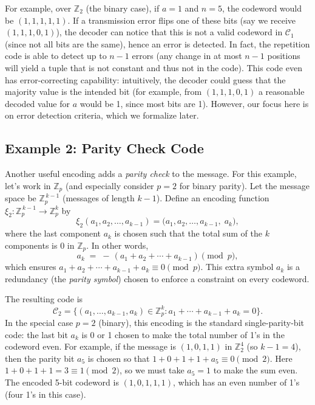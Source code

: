 \documentclass[docmute]{article}
\begin{document}
\medskip

For example, over $\mathbb{Z}_2$ (the binary case), if $a=1$ and $n=5$, the codeword would be $(1,1,1,1,1)$. If a transmission error flips one of these bits (say we receive $(1,1,1,0,1)$), the decoder can notice that this is not a valid codeword in $\mathcal{C}_1$ (since not all bits are the same), hence an error is detected. In fact, the repetition code is able to detect up to $n-1$ errors (any change in at most $n-1$ positions will yield a tuple that is not constant and thus not in the code). This code even has error-correcting capability: intuitively, the decoder could guess that the majority value is the intended bit (for example, from $(1,1,1,0,1)$ a reasonable decoded value for $a$ would be 1, since most bits are 1). However, our focus here is on error detection criteria, which we formalize later.

\subsection*{Example 2: Parity Check Code}
Another useful encoding adds a \emph{parity check} to the message. For this example, let's work in $\mathbb{Z}_p$ (and especially consider $p=2$ for binary parity). Let the message space be $\mathbb{Z}_p^{\,k-1}$ (messages of length $k-1$). Define an encoding function $\xi_2: \mathbb{Z}_p^{\,k-1} \to \mathbb{Z}_p^k$ by 
\[ \xi_2(a_1, a_2, \ldots, a_{k-1}) = \big(a_1, a_2, \ldots, a_{k-1}, \; a_k\big), \] 
where the last component $a_k$ is chosen such that the total sum of the $k$ components is 0 in $\mathbb{Z}_p$. In other words,
\[ a_k \;=\; -\,(a_1 + a_2 + \cdots + a_{k-1}) \pmod{p}, \] 
which ensures $a_1 + a_2 + \cdots + a_{k-1} + a_k \equiv 0 \pmod{p}$. This extra symbol $a_k$ is a redundancy (the \emph{parity symbol}) chosen to enforce a constraint on every codeword.

The resulting code is 
\[ \mathcal{C}_2 = \{(a_1,\ldots,a_{k-1},a_k) \in \mathbb{Z}_p^k : a_1 + \cdots + a_{k-1} + a_k = 0\}. \] 
In the special case $p=2$ (binary), this encoding is the standard single-parity-bit code: the last bit $a_k$ is 0 or 1 chosen to make the total number of 1's in the codeword even. For example, if the message is $(1,0,1,1)$ in $\mathbb{Z}_2^4$ (so $k-1=4$), then the parity bit $a_5$ is chosen so that $1+0+1+1+a_5 \equiv 0 \pmod{2}$. Here $1+0+1+1 = 3 \equiv 1 \pmod{2}$, so we must take $a_5 = 1$ to make the sum even. The encoded 5-bit codeword is $(1,0,1,1,1)$, which has an even number of 1's (four 1's in this case).
\end{document}
